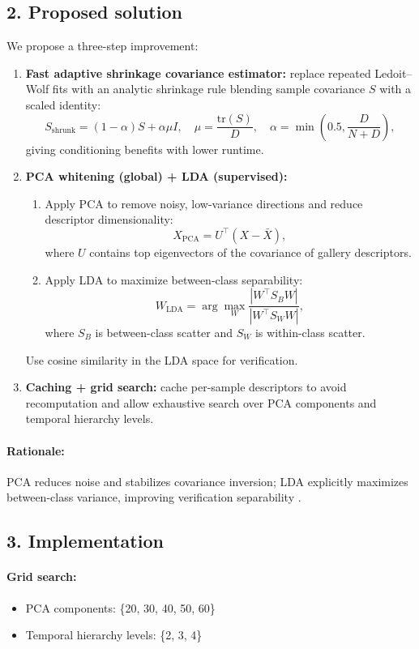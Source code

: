 \subsection*{2. Proposed solution}
\label{sec:proposal}
We propose a three-step improvement:
\begin{enumerate}
  \item \textbf{Fast adaptive shrinkage covariance estimator:} replace repeated Ledoit–Wolf fits with an analytic shrinkage rule blending sample covariance $S$ with a scaled identity:
  \[
  S_{\text{shrunk}} = (1-\alpha) S + \alpha \mu I, \quad 
  \mu = \frac{\mathrm{tr}(S)}{D}, \quad
  \alpha = \min\left(0.5, \frac{D}{N+D}\right),
  \]
  giving conditioning benefits with lower runtime.
  \item \textbf{PCA whitening (global) + LDA (supervised):} 
    \begin{enumerate}
      \item Apply PCA to remove noisy, low-variance directions and reduce descriptor dimensionality:
      \[
      X_{\text{PCA}} = U^\top (X - \bar{X}),
      \]
      where $U$ contains top eigenvectors of the covariance of gallery descriptors.
      \item Apply LDA to maximize between-class separability:
      \[
      W_{\text{LDA}} = \arg\max_W \frac{|W^\top S_B W|}{|W^\top S_W W|},
      \]
      where $S_B$ is between-class scatter and $S_W$ is within-class scatter.
    \end{enumerate}
    Use cosine similarity in the LDA space for verification.
  \item \textbf{Caching + grid search:} cache per-sample descriptors to avoid recomputation and allow exhaustive search over PCA components and temporal hierarchy levels.
\end{enumerate}

\paragraph{Rationale:} PCA reduces noise and stabilizes covariance inversion; LDA explicitly maximizes between-class variance, improving verification separability \cite{Belhumeur1997}.

\subsection*{3. Implementation}
\label{sec:implementation}

\paragraph{Grid search:}
\begin{itemize}
  \item PCA components: \{20, 30, 40, 50, 60\}  
  \item Temporal hierarchy levels: \{2, 3, 4\}
\end{itemize}

